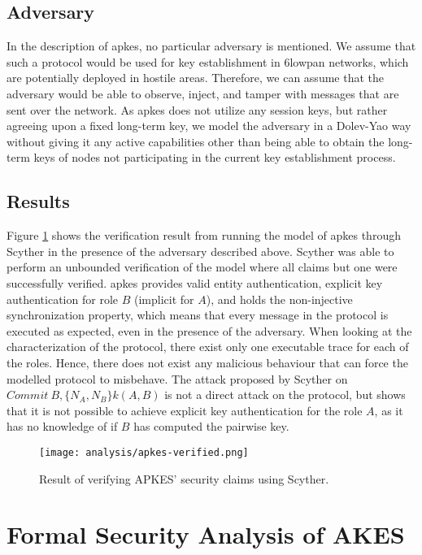 \subsection{Adversary}

In the description of \gls{apkes}, no particular adversary is mentioned. We assume that such a protocol would be used for key establishment in \gls{6lowpan} networks, which are potentially deployed in hostile areas. Therefore, we can assume that the adversary would be able to observe, inject, and tamper with messages that are sent over the network. As \gls{apkes} does not utilize any session keys, but rather agreeing upon a fixed long-term key, we model the adversary in a Dolev-Yao way without giving it any active capabilities other than being able to obtain the long-term keys of nodes not participating in the current key establishment process. 

\subsection{Results}

Figure \ref{fig:apkes-verified} shows the verification result from running the model of \gls{apkes} through Scyther in the presence of the adversary described above. Scyther was able to perform an unbounded verification of the model where all claims but one were successfully verified. \gls{apkes} provides valid entity authentication, explicit key authentication for role $B$ (implicit for $A$), and holds the non-injective synchronization property, which means that every message in the protocol is executed as expected, even in the presence of the adversary. When looking at the characterization of the protocol, there exist only one executable trace for each of the roles. Hence, there does not exist any malicious behaviour that can force the modelled protocol to misbehave. The attack proposed by Scyther on $Commit\ B, \{N_A, N_B\}k(A,B)$ is not a direct attack on the protocol, but shows that it is not possible to achieve explicit key authentication for the role $A$, as it has no knowledge of if $B$ has computed the pairwise key. 


\begin{figure}[h]
	\centering
	\texttt{[image: analysis/apkes-verified.png]}
	\caption{Result of verifying APKES' security claims using Scyther.}
	\label{fig:apkes-verified}
\end{figure}



\section{Formal Security Analysis of AKES}
\label{sec:akes-analysis}

